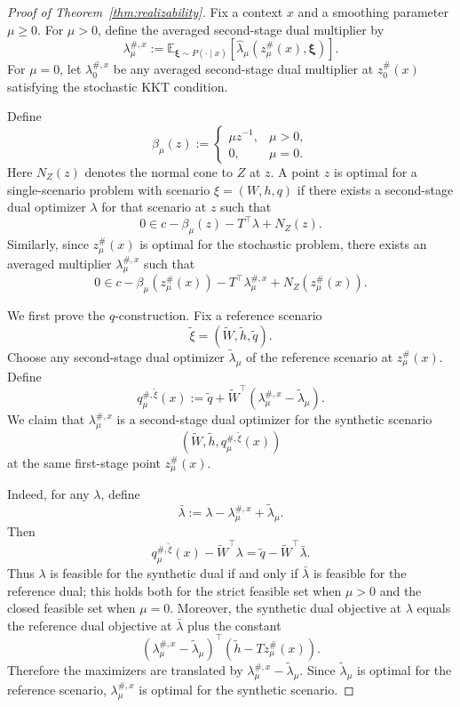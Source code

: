 \documentclass{article}
\newcommand{\E}{\mathbb{E}}
\newcommand{\1}{\mathbf{1}}
\theoremstyle{plain}
\theoremstyle{definition}
\theoremstyle{remark}
\begin{document}
\begin{proof}[Proof of Theorem~\ref{thm:realizability}]
Fix a context $x$ and a smoothing parameter $\mu\geq 0$. For $\mu>0$, define the averaged second-stage dual multiplier by
\[
\lambda_\mu^{\#,x}
:=
\E_{\boldsymbol\xi\sim P(\cdot\mid x)}
\left[
\hat\lambda_\mu\!\left(z_\mu^\#(x),\boldsymbol\xi\right)
\right].
\]
For $\mu=0$, let $\lambda_0^{\#,x}$ be any averaged second-stage dual multiplier at $z_0^\#(x)$ satisfying the stochastic KKT condition.

Define
\[
\beta_\mu(z)
:=
\begin{cases}
\mu z^{-1}, & \mu>0,\\
0, & \mu=0.
\end{cases}
\]
Here $N_Z(z)$ denotes the normal cone to $Z$ at $z$. A point $z$ is optimal for a single-scenario problem with scenario $\xi=(W,h,q)$ if there exists a second-stage dual optimizer $\lambda$ for that scenario at $z$ such that
\[
0\in c-\beta_\mu(z)-T^\top\lambda+N_Z(z).
\]
Similarly, since $z_\mu^\#(x)$ is optimal for the stochastic problem, there exists an averaged multiplier $\lambda_\mu^{\#,x}$ such that
\begin{equation}
\label{eq:realizability-proof-stochastic-kkt}
0\in c-\beta_\mu(z_\mu^\#(x))-T^\top\lambda_\mu^{\#,x}+N_Z(z_\mu^\#(x)).
\end{equation}

We first prove the $q$-construction. Fix a reference scenario
\[
\tilde\xi=(\widetilde W,\widetilde h,\widetilde q).
\]
Choose any second-stage dual optimizer $\widetilde\lambda_\mu$ of the reference scenario at $z_\mu^\#(x)$. Define
\[
q_\mu^{\#,\tilde\xi}(x)
:=
\widetilde q+\widetilde W^\top(\lambda_\mu^{\#,x}-\widetilde\lambda_\mu).
\]
We claim that $\lambda_\mu^{\#,x}$ is a second-stage dual optimizer for the synthetic scenario
\[
(\widetilde W,\widetilde h,q_\mu^{\#,\tilde\xi}(x))
\]
at the same first-stage point $z_\mu^\#(x)$.

Indeed, for any $\lambda$, define
\[
\bar\lambda
:=
\lambda-\lambda_\mu^{\#,x}+\widetilde\lambda_\mu.
\]
Then
\[
q_\mu^{\#,\tilde\xi}(x)-\widetilde W^\top\lambda
=
\widetilde q-\widetilde W^\top\bar\lambda.
\]
Thus $\lambda$ is feasible for the synthetic dual if and only if $\bar\lambda$ is feasible for the reference dual; this holds both for the strict feasible set when $\mu>0$ and the closed feasible set when $\mu=0$. Moreover, the synthetic dual objective at $\lambda$ equals the reference dual objective at $\bar\lambda$ plus the constant
\[
(\lambda_\mu^{\#,x}-\widetilde\lambda_\mu)^\top(\widetilde h-Tz_\mu^\#(x)).
\]
Therefore the maximizers are translated by $\lambda_\mu^{\#,x}-\widetilde\lambda_\mu$. Since $\widetilde\lambda_\mu$ is optimal for the reference scenario, $\lambda_\mu^{\#,x}$ is optimal for the synthetic scenario.


\end{proof}
\end{document}
